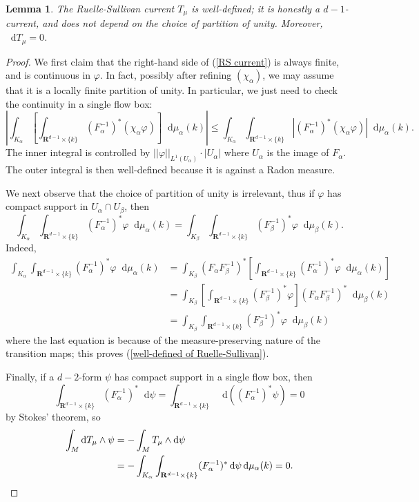 \documentclass[reqno,11pt]{amsart}
\newcommand{\RR}{\mathbf{R}}
\newcommand*\dif{\mathop{}\!\mathrm{d}}
\newtheorem{lemma}[theorem]{Lemma}
\theoremstyle{definition}
\numberwithin{equation}{section}
\begin{document}
\begin{lemma}
The Ruelle-Sullivan current $T_\mu$ is well-defined; it is honestly a $d-1$-current, and does not depend on the choice of partition of unity.
Moreover, $\dif T_\mu = 0$.
\end{lemma}
\begin{proof}
We first claim that the right-hand side of (\ref{RS current}) is always finite, and is continuous in $\varphi$.
In fact, possibly after refining $(\chi_\alpha)$, we may assume that it is a locally finite partition of unity.
In particular, we just need to check the continuity in a single flow box:
$$\left|\int_{K_\alpha} \left[\int_{\RR^{d - 1} \times \{k\}} (F_\alpha^{-1})^* (\chi_\alpha \varphi) \right] \dif \mu_\alpha(k)\right| \leq \int_{K_\alpha} \int_{\RR^{d - 1} \times \{k\}} |(F_\alpha^{-1})^* (\chi_\alpha \varphi)| \dif \mu_\alpha(k).$$
The inner integral is controlled by $||\varphi||_{L^1(U_\alpha)} \cdot |U_\alpha|$ where $U_\alpha$ is the image of $F_\alpha$.
The outer integral is then well-defined because it is against a Radon measure.

We next observe that the choice of partition of unity is irrelevant, thus if $\varphi$ has compact support in $U_\alpha \cap U_\beta$, then
\begin{equation}\label{well-defined of Ruelle-Sullivan}
\int_{K_\alpha} \int_{\RR^{d - 1} \times \{k\}} (F_\alpha^{-1})^* \varphi \dif \mu_\alpha(k) = \int_{K_\beta} \int_{\RR^{d - 1} \times \{k\}} (F_\beta^{-1})^* \varphi \dif \mu_\beta(k).
\end{equation}
Indeed,
\begin{align*}
\int_{K_\alpha} \int_{\RR^{d - 1} \times \{k\}} (F_\alpha^{-1})^* \varphi \dif \mu_\alpha(k)
&= \int_{K_\beta} (F_\alpha F_\beta^{-1})^* \left[\int_{\RR^{d - 1} \times \{k\}} (F_\alpha^{-1})^* \varphi \dif \mu_\alpha(k)\right] \\
&= \int_{K_\beta} \left[\int_{\RR^{d - 1} \times \{k\}} (F_\beta^{-1})^* \varphi\right] (F_\alpha F_\beta^{-1})^* \dif \mu_\beta(k) \\
&= \int_{K_\beta} \int_{\RR^{d - 1} \times \{k\}} (F_\beta^{-1})^* \varphi \dif \mu_\beta(k)
\end{align*}
where the last equation is because of the measure-preserving nature of the transition maps; this proves (\ref{well-defined of Ruelle-Sullivan}).

Finally, if a $d-2$-form $\psi$ has compact support in a single flow box, then
$$\int_{\RR^{d - 1} \times \{k\}} (F_\alpha^{-1})^* \dif \psi = \int_{\RR^{d - 1} \times \{k\}} \dif((F_\alpha^{-1})^* \psi) = 0$$
by Stokes' theorem, so
\begin{align*}
\int_M \dif T_\mu \wedge \psi &= -\int_M T_\mu \wedge \dif \psi \\
&= -\int_{K_\alpha} \int_{\RR^{d - 1} \times \{k\}} (F_\alpha^{-1})^* \dif \psi \dif \mu_\alpha(k) = 0. \qedhere
\end{align*}
\end{proof}
\end{document}
